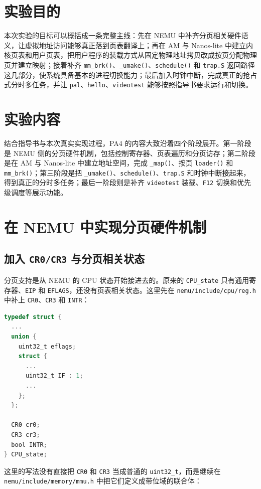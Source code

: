 \documentclass[a4paper]{article}
\begin{document}
\section{实验目的}
本次实验的目标可以概括成一条完整主线：先在 NEMU 中补齐分页相关硬件语义，让虚拟地址访问能够真正落到页表翻译上；再在 AM 与 Nanos-lite 中建立内核页表和用户页表，把用户程序的装载方式从固定物理地址拷贝改成按页分配物理页并建立映射；接着补齐 \texttt{mm\_brk()}、\texttt{\_umake()}、\texttt{schedule()} 和 \texttt{trap.S} 返回路径这几部分，使系统具备基本的进程切换能力；最后加入时钟中断，完成真正的抢占式分时多任务，并让 \texttt{pal}、\texttt{hello}、\texttt{videotest} 能够按照指导书要求运行和切换。

\section{实验内容}
结合指导书与本次真实实现过程，PA4 的内容大致沿着四个阶段展开。第一阶段是 NEMU 侧的分页硬件机制，包括控制寄存器、页表遍历和分页访存；第二阶段是在 AM 与 Nanos-lite 中建立地址空间，完成 \texttt{\_map()}、按页 \texttt{loader()} 和 \texttt{mm\_brk()}；第三阶段是把 \texttt{\_umake()}、\texttt{schedule()}、\texttt{trap.S} 和时钟中断接起来，得到真正的分时多任务；最后一阶段则是补齐 \texttt{videotest} 装载、\texttt{F12} 切换和优先级调度等展示功能。

\section{在 NEMU 中实现分页硬件机制}

\subsection{加入 \texttt{CR0/CR3} 与分页相关状态}
分页支持是从 NEMU 的 CPU 状态开始接进去的。原来的 \texttt{CPU\_state} 只有通用寄存器、\texttt{EIP} 和 \texttt{EFLAGS}，还没有页表相关状态。这里先在 \texttt{nemu/include/cpu/reg.h} 中补上 \texttt{CR0}、\texttt{CR3} 和 \texttt{INTR}：

\begin{lstlisting}[language=C]
typedef struct {
  ...
  union {
    uint32_t eflags;
    struct {
      ...
      uint32_t IF : 1;
      ...
    };
  };

  CR0 cr0;
  CR3 cr3;
  bool INTR;
} CPU_state;
\end{lstlisting}

这里的写法没有直接把 \texttt{CR0} 和 \texttt{CR3} 当成普通的 \texttt{uint32\_t}，而是继续在 \texttt{nemu/include/memory/mmu.h} 中把它们定义成带位域的联合体：
\end{document}
